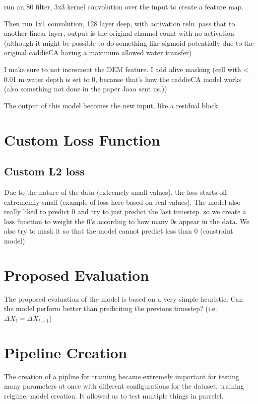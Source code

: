 run an 80 filter, 3x3 kernel convolution over the input to create a feature map.

Then run 1x1 convolution, 128 layer deep, with activation relu.
pass that to another linear layer, output is the original channel count with no activation (although it might be possible to do something like sigmoid potentially due to the original caddieCA having a maximum allowed water transfer)

I make sure to not increment the DEM feature. I add alive masking (cell with \textless{} {0.01} m water depth is set to 0, because that's how the caddieCA model works (also something not done in the paper Joao sent us.))

The output of this model  becomes the new input, like a residual block.



\section{Custom Loss Function}
\subsection{Custom L2 loss}
Due to the nature of the data (extremely small values), the loss starts off extrememly small (example of loss here based on real values). The model also really liked to predict 0 and try to just predict the last timestep. so we create a loss function to weight the 0's according to how many 0s appear in the data. We also try to mask it so that the model cannot predict less than 0 (constraint model)
\section{Proposed Evaluation}
The proposed evaluation of the model is based on a very simple heuristic. Can the model perform better than prediciting the previous timestep? (i.e. $\Delta{X_{t}} = \Delta{X_{t-1}}$)
\section{Pipeline Creation}
The creation of a pipline for training became extremely important for testing many parameters at once with different configurations for the dataset, training reigime, model creation. It allowed us to test multiple things in parrelel.